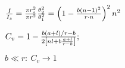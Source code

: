 
${I\over I_s}={\pi r_s^2\over\pi
r^2}{\theta_2^2\over\theta_1^2}=\left(1-{b(n-1)^2\over r\cdot
n}\right)^2n^2$

$C_v=1-{b(a+l)/r-b\over2\left[nl+b{a+l\over r-b}\right]};$

$b\ll r:\ C_v\rightarrow1$

